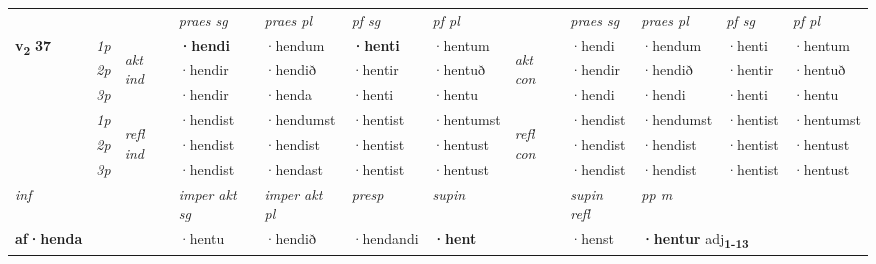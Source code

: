 \begin{longtable}[l]{X>{\footnotesize\itshape}llXXXXlXXXX}
 & &   & \textit{praes sg}  & \textit{praes pl}    & \textit{ pf sg} & \textit{pf pl} & & \textit{praes sg}  & \textit{praes pl}    & \textit{pf sg} & \textit{pf pl }  \\ \cmidrule{4-7} \cmidrule{9-12}
 \multirow{2}{*}{{{\textbf{v{\textsubscript{2}}} \Large{\textbf{37}}}}}  & 1p & \multirow{3}{*}{\begin{turn}{90}\textit{akt ind}\end{turn}} & \textbf{·hendi} & ·hendum & \textbf{·henti} & ·hentum & \multirow{3}{*}{\begin{turn}{90}\textit{akt con}\end{turn}} &·hendi & ·hendum & ·henti & ·hentum\\*
 & 2p &  &  ·hendir  & ·hendið & ·hentir & ·hentuð & & ·hendir & ·hendið & ·hentir & ·hentuð \\*
 & 3p &  & ·hendir & ·henda & ·henti & ·hentu & & ·hendi & ·hendi& ·henti & ·hentu \\*
\cmidrule{4-7} \cmidrule{9-12}
 & 1p & \multirow{3}{*}{\begin{turn}{90}\textit{refl ind}\end{turn}}  & ·hendist & ·hendumst & ·hentist & ·hentumst & \multirow{3}{*}{\begin{turn}{90}\textit{refl con}\end{turn}}  &·hendist & ·hendumst & ·hentist & ·hentumst \\*
 & 2p &  & ·hendist & ·hendist & ·hentist & ·hentust & &·hendist & ·hendist & ·hentist & ·hentust \\*
 & 3p  & & ·hendist & ·hendast & ·hentist & ·hentust & & ·hendist & ·hendist& ·hentist & ·hentust \\*
\cmidrule{4-7} \cmidrule{9-12}

   {\textit{inf}} & &  & \textit{imper akt sg} & \textit{imper akt pl}   & \textit{presp} & \textit{supin} && \textit{supin refl} & \textit{pp m} \\*
  {\textbf{af\allowbreak ·henda}} & && ·hentu  & ·hendið   & ·hendandi &  \textbf{·hent} && ·henst & \multicolumn{2}{l}{\textbf{·hentur} adj\textbf{\textsubscript{1-13}}} \\*

\midrule


\end{longtable}
